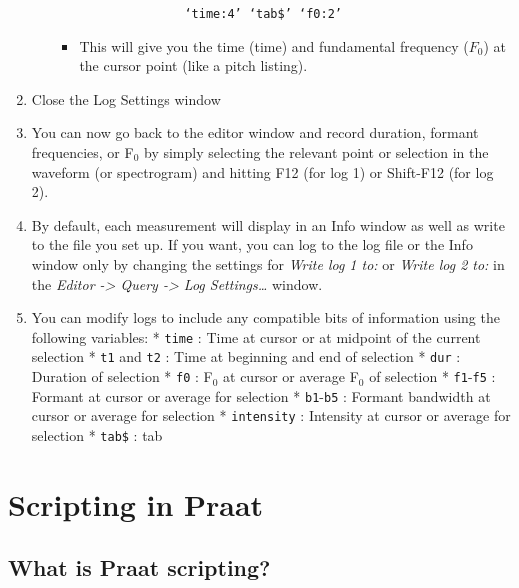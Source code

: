 \documentclass[11pt]{article}
\def\tightlist{}
\begin{document}
\begin{enumerate}
\begin{itemize}
    \begin{verbatim}
                  ‘time:4’ ‘tab$’ ‘f0:2’
              \end{verbatim}

    \begin{itemize}
    \tightlist
    \item
      This will give you the time (time) and fundamental frequency
      (\(F_0\)) at the cursor point (like a pitch listing).
    \end{itemize}
  \end{itemize}
\item
  Close the Log Settings window
\item
  You can now go back to the editor window and record duration, formant
  frequencies, or F$_{0}$ by simply selecting the relevant point or selection
  in the waveform (or spectrogram) and hitting F12 (for log 1) or
  Shift-F12 (for log 2).
\item
  By default, each measurement will display in an Info window as well as
  write to the file you set up. If you want, you can log to the log file
  or the Info window only by changing the settings for \emph{Write log 1
  to:} or \emph{Write log 2 to:} in the \emph{Editor -\textgreater{}
  Query -\textgreater{} Log Settings\ldots{}} window.
\item
  You can modify logs to include any compatible bits of information
  using the following variables: * \texttt{time} : Time at cursor or at
  midpoint of the current selection * \texttt{t1} and \texttt{t2} : Time
  at beginning and end of selection * \texttt{dur} : Duration of
  selection * \texttt{f0} : F$_{0}$ at cursor or average F$_{0}$ of selection *
  \texttt{f1}-\texttt{f5} : Formant at cursor or average for selection *
  \texttt{b1}-\texttt{b5} : Formant bandwidth at cursor or average for
  selection * \texttt{intensity} : Intensity at cursor or average for
  selection * \texttt{tab\$} : tab
\end{enumerate}

\hypertarget{scripting-in-praat}{%
\section{Scripting in Praat}\label{scripting-in-praat}}

\label{sec:scripting}

\hypertarget{what-is-praat-scripting}{%
\subsection{What is Praat scripting?}\label{what-is-praat-scripting}}
\end{document}
